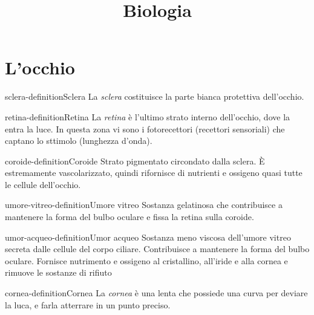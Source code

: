 \documentclass[preview]{standalone}
\begin{document}
\title{Biologia}
\genpage

\section{L'occhio}




\begin{snippetdefinition}{sclera-definition}{Sclera}
    La \textit{sclera} costituisce la parte bianca protettiva dell'occhio.
\end{snippetdefinition}

\begin{snippetdefinition}{retina-definition}{Retina}
    La \textit{retina} è l'ultimo strato interno dell'occhio, dove la entra la luce.
    In questa zona vi sono i fotorecettori (recettori sensoriali) che captano lo sttimolo (lunghezza d'onda).
\end{snippetdefinition}

\begin{snippetdefinition}{coroide-definition}{Coroide}
    Strato pigmentato circondato dalla sclera. È estremamente vascolarizzato, quindi rifornisce
    di nutrienti e ossigeno quasi tutte le cellule dell'occhio.
\end{snippetdefinition}

\begin{snippetdefinition}{umore-vitreo-definition}{Umore vitreo}
    Sostanza gelatinosa che contribuisce a mantenere la forma del bulbo oculare e fissa la
    retina sulla coroide.
\end{snippetdefinition}

\begin{snippetdefinition}{umor-acqueo-definition}{Umor acqueo}
    Sostanza meno viscosa dell'umore vitreo secreta dalle cellule del corpo ciliare. Contribuisce
    a mantenere la forma del bulbo oculare. Fornisce nutrimento e ossigeno al cristallino,
    all'iride e alla cornea e rimuove le sostanze di rifiuto
\end{snippetdefinition}

\begin{snippetdefinition}{cornea-definition}{Cornea}
    La \textit{cornea} è una lenta che possiede una curva per deviare la luca, e farla atterrare in un punto preciso.
\end{snippetdefinition}
\end{document}
